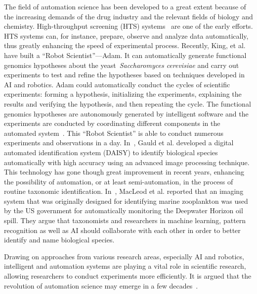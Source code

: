 The field of automation science has been developed to a great extent because of the increasing demands of the drug industry and the relevant fields of biology and chemistry. High-throughput screening (HTS) systems~\cite{Persidis_1998} are one of the early efforts. HTS systems can, for instance,  prepare, observe and analyze data automatically, thus greatly enhancing the speed of experimental process. Recently, King, et al.~\cite{King_2004, King_2009} have built a ``Robot Scientist''---Adam.  It can automatically generate functional genomics hypotheses about the yeast~\textit{Saccharomyces cerevisiae} and carry out experiments to test and refine the hypotheses based on techniques developed in AI and robotics. Adam could automatically conduct the cycles of scientific experiments: forming a hypothesis, initializing the experiments, explaining the results and verifying the hypothesis, and then repeating the cycle. The functional genomics hypotheses are autonomously generated by intelligent software and the experiments are conducted by coordinating different components in the automated system~\cite{King_2004}. This ``Robot Scientist'' is able to conduct numerous experiments and observations in a day. In~\cite{Gauld_2000}, Gauld et al. developed a digital automated identification system (DAISY) to identify biological species automatically with high accuracy using an advanced image processing technique. This technology has gone though great improvement in recent years, enhancing the possibility of automation, or at least semi-automation, in the process of routine taxonomic identification. In~\cite{MacLeod_2010}, MacLeod et al. reported that an imaging system that was originally designed for identifying marine zooplankton was used by the US government for automatically monitoring the Deepwater Horizon oil spill. They argue that taxonomists and researchers in machine learning, pattern recognition as well as AI should collaborate with each other in order to better identify and name biological species. 

Drawing on approaches from various research areas, especially AI and robotics, intelligent and automation systems are playing a vital role in scientific research, allowing researchers to conduct experiments more efficiently. It is argued that the revolution of automation science may emerge in a few decades~\cite{King_2009}.

